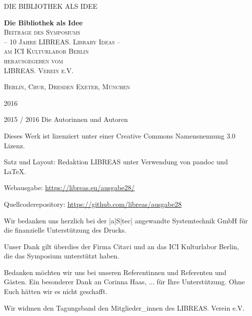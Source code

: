 \documentclass[10.5pt,a5paper,twoside]{memoir}
\newlength\drop
\newcommand*\titleM{\begingroup%
\setlength\drop{0.08\textheight}
\centering
\vspace*{\drop}
{\Huge\bfseries Die Bibliothek als Idee}\\[\baselineskip]
{\scshape Beiträge des Symposiums \\ -- 10 Jahre LIBREAS. Library Ideas -- \\ am ICI Kulturlabor Berlin}\\[\baselineskip]
\vfill
{\large\scshape {\small herausgegeben vom}\\{\large LIBREAS. Verein e.V.}}\par
\vfill
{\scshape Berlin, Chur, Dresden Exeter, München}\par
\vfill
{\scshape 2016}\par
\endgroup}
\begin{document}
\frontmatter

\pagestyle{empty}
\begin{flushright}
{\LARGE DIE BIBLIOTHEK ALS IDEE} 
\end{flushright}

\cleartorecto

\pagestyle{empty}
\titleM
\cleartoverso


\begingroup
\footnotesize
\parindent 0pt
\parskip \baselineskip
\vspace*{\fill}
\textcopyright{} 2015 / 2016 Die Autorinnen und Autoren

Dieses Werk ist lizenziert unter einer Creative Commons Namensnennung 3.0 Lizenz.

Satz und Layout: Redaktion LIBREAS unter Verwendung von pandoc und \LaTeX\xspace. 

Webausgabe: \url{https://libreas.eu/ausgabe28/}

Quellcoderepository: \url{https://github.com/libreas/ausgabe28}

    \endgroup
\newpage

\begin{flushright}
Wir bedanken uns herzlich bei der |a|S|tec| angewandte Systemtechnik GmbH für die finanzielle Unterstützung des Drucks. 

\vspace{10mm}

Unser Dank gilt überdies der Firma Citavi und an das ICI Kulturlabor Berlin, die das Symposium unterstützt haben.

\vspace{10mm}

Bedanken möchten wir uns bei unseren Referentinnen und Referenten und Gästen. Ein besonderer Dank an Corinna Haas, ... für Ihre Unterstützung. Ohne Euch hätten wir es nicht geschafft.

\vspace{10mm}

Wir widmen den Tagungsband den Mitglieder\_innen des LIBREAS. Verein e.V.
\end{flushright}
\end{document}
